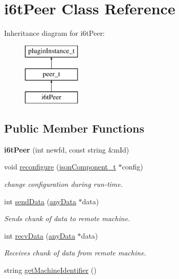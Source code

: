 \hypertarget{classi6tPeer}{\section{i6t\-Peer \-Class \-Reference}
\label{classi6tPeer}
}
\-Inheritance diagram for i6t\-Peer\-:\begin{figure}[H]
\begin{center}
\leavevmode
\includegraphics[height=3.000000cm]{classi6tPeer}
\end{center}
\end{figure}
\subsection*{\-Public \-Member \-Functions}
\begin{DoxyCompactItemize}
\item 
\hypertarget{classi6tPeer_ac981227907e79268de9573a10d16a1d9}{{\bfseries i6t\-Peer} (int newfd, const string \&m\-Id)}\label{classi6tPeer_ac981227907e79268de9573a10d16a1d9}

\item 
void \hyperlink{classi6tPeer_aeeddef82753b725c5d1b8379cc203396}{reconfigure} (\hyperlink{classjsonComponent__t}{json\-Component\-\_\-t} $\ast$config)
\begin{DoxyCompactList}\small\item\em change configuration during run-\/time. \end{DoxyCompactList}\item 
int \hyperlink{classi6tPeer_ab07ff2fb0968f937b9f908cc208ccceb}{send\-Data} (\hyperlink{structanyData}{any\-Data} $\ast$data)
\begin{DoxyCompactList}\small\item\em \-Sends chunk of data to remote machine. \end{DoxyCompactList}\item 
int \hyperlink{classi6tPeer_ab5418d26ab1265b15e3572bf3b325cf8}{recv\-Data} (\hyperlink{structanyData}{any\-Data} $\ast$data)
\begin{DoxyCompactList}\small\item\em \-Receives chunk of data from remote machine. \end{DoxyCompactList}\item 
string \hyperlink{classi6tPeer_a8ba15362d2f3f36e2aa7b07369bedf13}{get\-Machine\-Identifier} ()
\end{DoxyCompactItemize}


